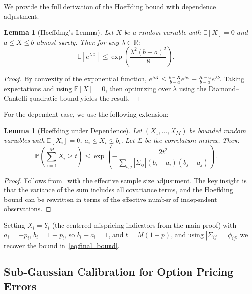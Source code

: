 \documentclass[11pt,a4paper]{article}
\theoremstyle{plain}
\newtheorem{lemma}[theorem]{Lemma}
\theoremstyle{definition}
\theoremstyle{remark}
\newcommand{\R}{\mathbb{R}}
\newcommand{\E}{\mathbb{E}}
\newcommand{\Pbb}{\mathbb{P}}
\begin{document}
We provide the full derivation of the Hoeffding bound with dependence adjustment.

\begin{lemma}[Hoeffding's Lemma]\label{lem:hoeffding_lemma}
Let $X$ be a random variable with $\E[X] = 0$ and $a \leq X \leq b$ almost surely. Then for any $\lambda \in \R$:
\begin{equation}\label{eq:hoeffding_lemma}
  \E[e^{\lambda X}] \leq \exp\!\left(\frac{\lambda^2 (b-a)^2}{8}\right).
\end{equation}
\end{lemma}

\begin{proof}
By convexity of the exponential function, $e^{\lambda X} \leq \frac{b-X}{b-a} e^{\lambda a} + \frac{X-a}{b-a} e^{\lambda b}$. Taking expectations and using $\E[X] = 0$, then optimizing over $\lambda$ using the Diamond--Cantelli quadratic bound yields the result.
\end{proof}

For the dependent case, we use the following extension:

\begin{lemma}[Hoeffding under Dependence]\label{lem:hoeffding_dependent}
Let $(X_1, \dots, X_M)$ be bounded random variables with $\E[X_i] = 0$, $a_i \leq X_i \leq b_i$. Let $\Sigma$ be the correlation matrix. Then:
\begin{equation}\label{eq:hoeffding_dep}
  \Pbb\!\left(\sum_{i=1}^M X_i \geq t\right) \leq \exp\!\left(-\frac{2t^2}{\sum_{i,j} |\Sigma_{ij}| (b_i-a_i)(b_j-a_j)}\right).
\end{equation}
\end{lemma}

\begin{proof}
Follows from~\citet{bentkus2005hoeffding} with the effective sample size adjustment. The key insight is that the variance of the sum includes all covariance terms, and the Hoeffding bound can be rewritten in terms of the effective number of independent observations.
\end{proof}

Setting $X_i = Y_i$ (the centered mispricing indicators from the main proof) with $a_i = -p_i$, $b_i = 1-p_i$, so $b_i - a_i = 1$, and $t = M(1 - \bar{p})$, and using $|\Sigma_{ij}| = \phi_{ij}$, we recover the bound in~\eqref{eq:final_bound}.

\subsection{Sub-Gaussian Calibration for Option Pricing Errors}
\end{document}
